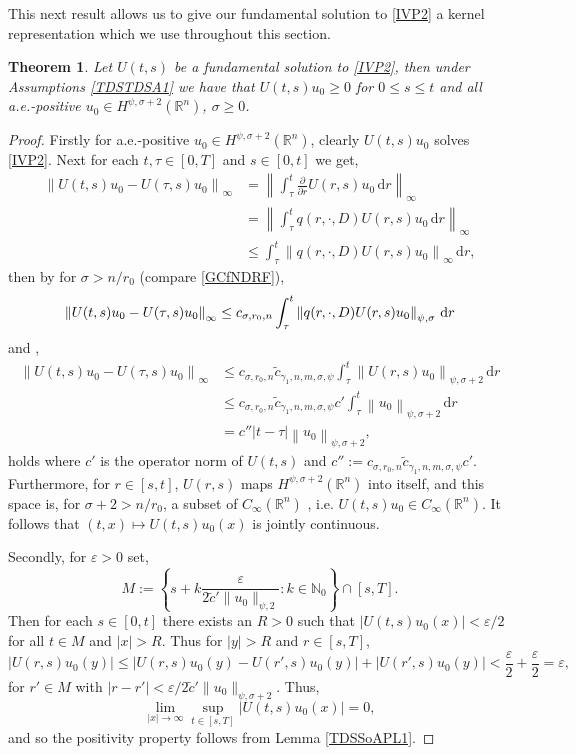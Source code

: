 \documentclass[a4paper, 12pt]{report}
\newtheorem{theorem}{Theorem}[section]
\theoremstyle{cor}
\theoremstyle{remark}
\theoremstyle{definition}
\begin{document}
This next result allows us to give our fundamental solution to \eqref{IVP2} a kernel representation which we use throughout this section.
\begin{theorem}\label{TDSSoAPT1}
Let $U(t, s)$ be a fundamental solution to \eqref{IVP2}, then under Assumptions \ref{TDSTDSA1} we have that $U(t, s)u_0 \ge 0$ for $0 \le s \le t$ and all a.e.-positive $u_0 \in H^{\psi, \sigma + 2}(\mathbb{R}^n)$, $\sigma \ge 0$.
\end{theorem}
\begin{proof}
Firstly for a.e.-positive $u_0 \in H^{\psi, \sigma + 2}(\mathbb{R}^n)$, clearly $U(t, s)u_0$ solves \eqref{IVP2}.  Next for each $t, \tau \in [0, T]$ and $s \in [0, t]$ we get,
$$
\begin{aligned}
\left\|U(t, s)u_0 - U(\tau, s)u_0\right\|_\infty & = \left\|\int_\tau ^t\frac{\partial}{\partial r}U(r, s)u_0\,\mathrm{d}r\right\|_\infty\\
& = \left\|\int_\tau ^tq(r, \cdot, D)U(r, s)u_0\,\mathrm{d}r\right\|_\infty\\
& \le \int_\tau^t\left\|q(r, \cdot, D)U(r, s)u_0\right\|_\infty\,\mathrm{d}r,
\end{aligned}
$$
then by \cite[Section 7]{RZ} for $\sigma > n/r_0$ (compare \eqref{GCfNDRF}),
$$
\left\|U(t, s)u_0 - U(\tau, s)u_0\right\|_\infty \le c_{\sigma, r_0, n}\int_\tau^t\left\|q(r, \cdot, D)U(r, s)u_0\right\|_{\psi, \sigma}\,\mathrm{d}r\\
$$
and \cite[Proposition 6.6 + Theorem 6.11]{RZ},
$$
\begin{aligned}
\left\|U(t, s)u_0 - U(\tau, s)u_0\right\|_\infty & \le c_{\sigma, r_0, n}\tilde{c}_{\gamma_1, n, m, \sigma, \psi}\int_\tau^t\left\|U(r, s)u_0\right\|_{\psi, \sigma + 2}\,\mathrm{d}r\\
& \le c_{\sigma, r_0, n}\tilde{c}_{\gamma_1, n, m, \sigma, \psi}c'\int_\tau ^t\left\|u_0\right\|_{\psi, \sigma + 2}\,\mathrm{d}r\\
& = c''|t - \tau|\left\|u_0\right\|_{\psi, \sigma + 2},
\end{aligned}
$$
holds where $c'$ is the operator norm of $U(t, s)$ and $c'' := c_{\sigma, r_0, n}\tilde{c}_{\gamma_1, n, m, \sigma, \psi}c'$.  Furthermore, for $ r \in [s, t]$, $U(r, s)$ maps $H^{\psi, \sigma + 2}(\mathbb{R}^n)$ into itself, and this space is, for $\sigma + 2 > n/r_0$, a subset of $C_\infty(\mathbb{R}^n)$ \cite[Section 2.6]{Vol2}, i.e. $U(t, s)u_0 \in C_\infty(\mathbb{R}^n)$.  It follows that $(t, x) \mapsto U(t, s)u_0(x)$ is jointly continuous.

Secondly, for $\varepsilon > 0$ set,
$$
M := \left\{s + k\frac{\varepsilon}{2\tilde{c}'\|u_0\|_{\psi, 2}} : k \in \mathbb{N}_0\right\} \cap [s, T].
$$
Then for each $s \in [0, t]$ there exists an $R > 0$ such that $|U(t, s)u_0(x)| < \varepsilon/2$ for all $t \in M$ and $|x| > R$.  Thus for $|y| > R$ and $r \in [s, T]$,
$$
|U(r, s)u_0(y)| \le |U(r, s)u_0(y) - U(r', s)u_0(y)| + |U(r', s)u_0(y)| < \frac{\varepsilon}{2} + \frac{\varepsilon}{2} = \varepsilon,
$$
for $r' \in M$ with $|r - r'| < \varepsilon/2\tilde{c}'\|u_0\|_{\psi, \sigma + 2}$.  Thus,
$$
\lim_{|x| \to \infty}\sup_{t \in [s, T]}|U(t, s)u_0(x)| = 0,
$$
and so the positivity property follows from Lemma \ref{TDSSoAPL1}.
\end{proof}
\end{document}
